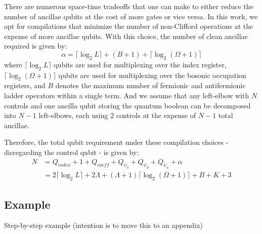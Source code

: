 There are numerous space-time tradeoffs that one can make to either reduce the number of ancillae qubits at the cost of more gates or vice versa.
In this work, we opt for compilations that minimize the number of non-Clifford operations at the expense of more ancillae qubits.
With this choice, the number of clean ancillae required is given by:
\begin{equation}
    \alpha = \lceil \log_2{L} \rceil + (B + 1) + \lceil \log_2{(\Omega + 1)} \rceil
\end{equation}
where $\lceil \log_2{L} \rceil$ qubits are used for multiplexing over the index register, $ \lceil \log_2{(\Omega + 1)} \rceil$ qubits are used for multiplexing over the bosonic occupation registers, and $B$ denotes the maximum number of fermionic and antifermionic ladder operators within a single term.
And we assume that any left-elbow with $N$ controls and one ancilla qubit storing the quantum boolean can be decomposed into $N-1$ left-elbows, each using $2$ controls at the expense of $N-1$ total ancillae.

Therefore, the total qubit requirement under these compilation choices - disregarding the control qubit - is given by:
\begin{equation}
    \begin{split}
        N &= Q_{\textit{index}} + 1 + Q_{\textit{coeff}} + Q_{\psi_b} + Q_{\psi_d} + Q_{\psi_a} + \alpha \\
        &= 2 \lceil \log_2{L} \rceil + 2 \Lambda + (\Lambda + 1) \lceil \log_2{(\Omega + 1)} \rceil + B + K + 3
    \end{split}
\end{equation}

\subsection{Example}
\label{subsec:example}
Step-by-step example (intention is to move this to an appendix)
